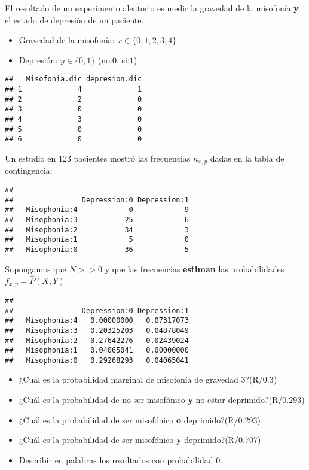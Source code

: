 \documentclass[
]{book}
\providecommand{\tightlist}{%
  \setlength{\itemsep}{0pt}\setlength{\parskip}{0pt}}
\begin{document}
El resultado de un experimento aleatorio es medir la gravedad de la misofonía \textbf{y} el estado de depresión de un paciente.

\begin{itemize}
\tightlist
\item
  Gravedad de la misofonía: \(x\in \{0,1,2,3,4\}\)
\item
  Depresión: \(y\in \{0,1\}\) (no:\(0\), si:\(1\))
\end{itemize}

\begin{verbatim}
##   Misofonia.dic depresion.dic
## 1             4             1
## 2             2             0
## 3             0             0
## 4             3             0
## 5             0             0
## 6             0             0
\end{verbatim}

Un estudio en 123 pacientes mostró las frecuencias \(n_{x,y}\) dadas en la tabla de contingencia:

\begin{verbatim}
##               
##                Depression:0 Depression:1
##   Misophonia:4            0            9
##   Misophonia:3           25            6
##   Misophonia:2           34            3
##   Misophonia:1            5            0
##   Misophonia:0           36            5
\end{verbatim}

Supongamos que \(N>>0\) y que las frecuencias \textbf{estiman} las probabilidades \(f_{x,y}=\hat{P}(X, Y)\)

\begin{verbatim}
##               
##                Depression:0 Depression:1
##   Misophonia:4   0.00000000   0.07317073
##   Misophonia:3   0.20325203   0.04878049
##   Misophonia:2   0.27642276   0.02439024
##   Misophonia:1   0.04065041   0.00000000
##   Misophonia:0   0.29268293   0.04065041
\end{verbatim}

\begin{itemize}
\tightlist
\item
  ¿Cuál es la probabilidad marginal de misofonía de gravedad 3?(R/0.3)
\item
  ¿Cuál es la probabilidad de no ser misofónico \textbf{y} no estar deprimido?(R/0.293)
\item
  ¿Cuál es la probabilidad de ser misofónico \textbf{o} deprimido?(R/0.293)
\item
  ¿Cuál es la probabilidad de ser misofónico \textbf{y} deprimido?(R/0.707)
\item
  Describir en palabras los resultados con probabilidad 0.
\end{itemize}
\end{document}
